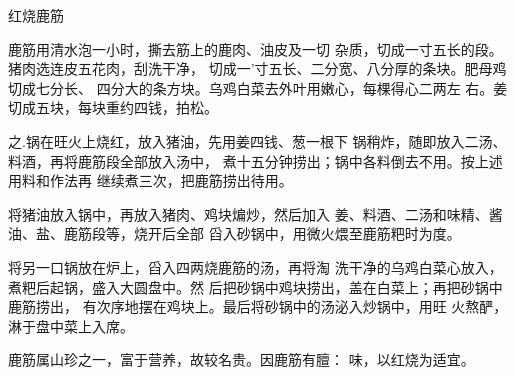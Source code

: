 \begin{recipe}{红烧鹿筋}

\ingredients


\cooking

\step 鹿筋用清水泡一小时，撕去筋上的鹿肉、油皮及一切 杂质，切成一寸五长的段。猪肉选连皮五花肉，刮洗干净， 切成一'寸五长、二分宽、八分厚的条块。肥母鸡切成七分长、 四分大的条方块。乌鸡白菜去外叶用嫩心，每棵得心二两左 右。姜切成五块，每块重约四钱，拍松。

之.锅在旺火上烧红，放入猪油，先用姜四钱、葱一根下 锅稍炸，随即放入二汤、料酒，再将鹿筋段全部放入汤中， 煮十五分钟捞出；锅中各料倒去不用。按上述用料和作法再 继续煮三次，把鹿筋捞出待用。

\step 	将猪油放入锅中，再放入猪肉、鸡块煸炒，然后加入 姜、料酒、二汤和味精、酱油、盐、鹿筋段等，烧开后全部 舀入砂锅中，用微火煨至鹿筋粑时为度。

\step 	将另一口锅放在炉上，舀入四两烧鹿筋的汤，再将淘 洗干净的乌鸡白菜心放入，煮粑后起锅，盛入大圆盘中。然 后把砂锅中鸡块捞出，盖在白菜上；再把砂锅中鹿筋捞出， 有次序地摆在鸡块上。最后将砂锅中的汤泌入炒锅中，用旺 火熬酽，淋于盘中菜上入席。

\notes

鹿筋属山珍之一，富于营养，故较名贵。因鹿筋有膻： 味，以红烧为适宜。

\end{recipe}

